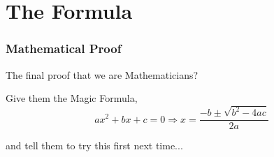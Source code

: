 \documentclass[
    10pt %
    16:9, %
]{beamer}
\begin{document}
\section{The Formula}

\frame %
{
  \frametitle{Mathematical Proof}
 
 The final proof that we are Mathematicians?
 
\bigskip
 \pause
 
 Give them the Magic Formula,  
 $$ ax^2 + bx + c = 0 \Longrightarrow x = \frac{-b \pm \sqrt{b^2 - 4ac}}{2a}$$
 
\bigskip
 \pause
 
 and tell them to try this first next time...
 

}

 
\end{document}
